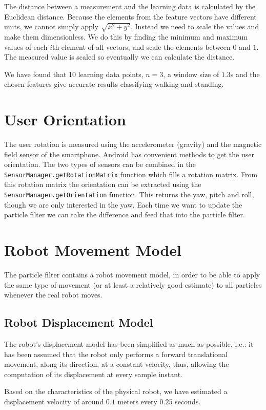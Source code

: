 \documentclass[journal]{IEEEtran}
\begin{document}
The distance between a measurement and the learning data is calculated by the
Euclidean distance. Because the elements from the feature vectors have
different units, we cannot simply apply $\sqrt{ x^2+y^2 }$. Instead we need to
scale the values and make them dimensionless. We do this by finding the minimum
and maximum values of each $i$th element of all vectors, and scale the elements
between $0$ and $1$. The measured value is scaled so eventually we can
calculate the distance.

We have found that 10 learning data points, $n=3$, a window size of $1.3$s
and the chosen features give accurate results classifying walking and standing.

\section{User Orientation}
The user rotation is measured using the accelerometer (gravity) and the
magnetic field sensor of the smartphone. Android has convenient methods to get
the user orientation. The two types of sensors can be combined in the
\texttt{SensorManager.getRotationMatrix} function which fills a rotation
matrix. From this rotation matrix the orientation can be extracted using the
\texttt{SensorManager.getOrientation} function. This returns the yaw, pitch
and roll, though we are only interested in the yaw. Each time we want to update
the particle filter we can take the difference and feed that into the particle
filter.

\section{Robot Movement Model}
The particle filter contains a robot movement model, in order to be able to apply the same type of movement (or at least a relatively good estimate) to all particles whenever the real robot moves. 

\subsection{Robot Displacement Model}
The robot's displacement model has been simplified as much as possible, i.e.: it has been assumed that the robot only performs a forward translational movement, along its direction, at a constant velocity, thus, allowing the computation of its displacement at every sample instant. 

Based on the characteristics of the physical robot, we have estimated a displacement velocity of around $0.1$ meters every $0.25$ seconds. 
\end{document}
